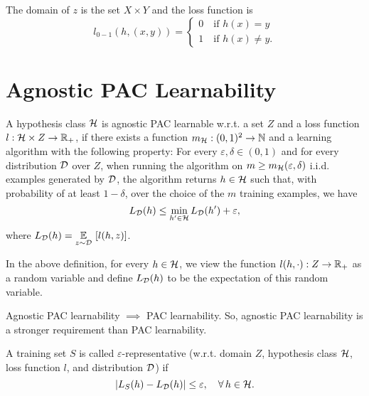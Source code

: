 \documentclass[11pt,a4paper]{article}
\begin{document}
\begin{example}
The domain of $z$ is the set $X\times Y$ and the loss function is 
\begin{equation*}
    l_{0-1}(h,(x,y)) = \begin{cases}
    0\quad \text{if }h(x) = y\\
    1\quad \text{if }h(x)\neq y.
    \end{cases}
\end{equation*}
\end{example}

\section{Agnostic PAC Learnability}

\begin{definition}
A hypothesis class $\mathcal{H}$ is agnostic PAC learnable w.r.t. a set $Z$ and a loss function $l:\mathcal{H}\times Z\rightarrow \mathbb{R}_+$, if there exists a function $m_{\mathcal{H}}:(0,1)^2\rightarrow \mathbb{N}$ and a learning algorithm with the following property: For every $\varepsilon,\delta\in(0,1)$ and for every distribution $\mathcal{D}$ over $Z$, when running the algorithm on $m\ge m_{\mathcal{H}}(\varepsilon,\delta)$ i.i.d. examples generated by $\mathcal{D}$, the algorithm returns $h\in\mathcal{H}$ such that, with probability of at least $1-\delta$, over the choice of the $m$ training examples, we have
\begin{equation*}
    L_{\mathcal{D}}(h)\le \underset{h'\in\mathcal{H}}{\text{min}}\,L_{\mathcal{D}}(h')+\varepsilon,
\end{equation*}
where $L_{\mathcal{D}}(h) = \underset{z\sim\mathcal{D}}{\mathbb{E}}\ [l(h,z)]$.
\end{definition}

\begin{remark}
In the above definition, for every $h\in \mathcal{H}$, we view the function $l(h,\cdot):Z\rightarrow \mathbb{R}_+$ as a random variable and define $L_{\mathcal{D}}(h)$ to be the expectation of this random variable.
\end{remark}

\begin{remark}
Agnostic PAC learnability $\implies$ PAC learnability. So, agnostic PAC learnability is a stronger requirement than PAC learnability.
\end{remark}

\begin{definition}
A training set $S$ is called $\varepsilon$-representative (w.r.t. domain $Z$, hypothesis class $\mathcal{H}$, loss function $l$, and distribution $\mathcal{D}$) if 
\begin{equation*}
    |L_S(h)-L_{\mathcal{D}}(h)|\le \varepsilon,\quad \forall\, h\in\mathcal{H}.
\end{equation*}
\end{definition}
\end{document}
